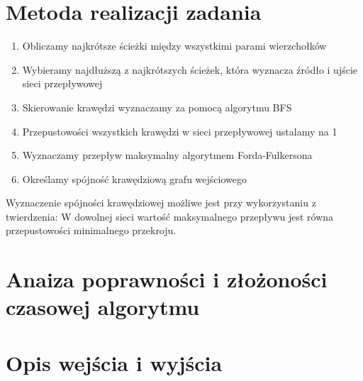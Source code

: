 \documentclass{article}
\begin{document}
\section{Metoda realizacji zadania}

\begin{enumerate}
\item Obliczamy najkrótsze ścieżki między wszystkimi parami wierzchołków
\item Wybieramy najdłuższą z najkrótszych ścieżek, która wyznacza źródło i ujście sieci przepływowej
\item Skierowanie krawędzi wyznaczamy za pomocą algorytmu BFS
\item Przepustowości wszystkich krawędzi w sieci przepływowej ustalamy na 1
\item Wyznaczamy przepływ maksymalny algorytmem Forda-Fulkersona
\item Określamy spójność krawędziową grafu wejściowego
\end{enumerate}


Wyznaczenie spójności krawędziowej możliwe jest przy wykorzystaniu z twierdzenia:
W dowolnej sieci wartość maksymalnego przepływu jest równa przepustowości minimalnego przekroju.

\section{Anaiza poprawności i złożoności czasowej algorytmu}

\section{Opis wejścia i wyjścia}
\end{document}
